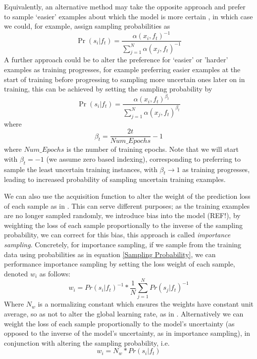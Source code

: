 \documentclass[a4paper,11pt]{article}
\begin{document}
Equivalently, an alternative method may take the opposite approach and prefer to sample `easier' examples about which the model is more certain , in which case we could, for example, assign sampling probabilities as
\begin{equation}
\Pr(s_i|f_t) = \frac{\alpha(x_i,f_t)^{-1}}{\sum_{j=1}^{N}\alpha(x_j,f_t)^{-1}}
\end{equation}
A further approach could be to alter the preference for `easier' or 'harder' examples as training progresses, for example preferring easier examples at the start of training before progressing to sampling more uncertain ones later on in training, this can be achieved by setting the sampling probability by
\begin{equation}
\Pr(s_i|f_t) = \frac{\alpha(x_i,f_t)^{\beta_t}}{\sum_{j=1}^{N}\alpha(x_j,f_t)^{\beta_t}}
\end{equation}
where
\begin{equation}
\beta_t = \frac{2t}{Num\_Epochs} - 1
\end{equation}
where $Num\_Epochs$ is the number of training epochs. Note that we will start with $\beta_t = -1$ (we assume zero based indexing), corresponding to preferring to sample the least uncertain training instances, with $\beta_t \rightarrow 1$ as training progresses, leading to increased probability of sampling uncertain training examples. 


We can also use the acquisition function to alter the weight of the prediction loss of each sample as in \cite{Chang 18}. This can serve different purposes; as the training examples are no longer sampled randomly, we introduce bias into the model (REF!), by weighting the loss of each sample proportionally to the inverse of the sampling probability, we can correct for this bias, this approach is called \textit{importance sampling}. Concretely, for importance sampling, if we sample from the training data using probabilities as in equation \ref{Sampling Probability}, we can performance importance sampling by setting the loss weight of each sample, denoted $w_i$ as follows:
\begin{equation}
w_i = Pr(s_i|f_t)^{-1} * \frac{1}{N}\sum_{j=1}^N Pr(s_j|f_t)^{-1}
\end{equation}
Where $N_w$ is a normalizing constant which ensures the weights have constant unit average, so as not to alter the global learning rate, as in \cite{Chang 18}.
Alternatively we can weight the loss of each sample proportionally to the model's uncertainty (as opposed to the inverse of the model's uncertainty, as in importance sampling), in conjunction with altering the sampling probability, i.e.
\begin{equation}
w_i = N_w*Pr(s_i|f_t) 
\end{equation}
\end{document}

